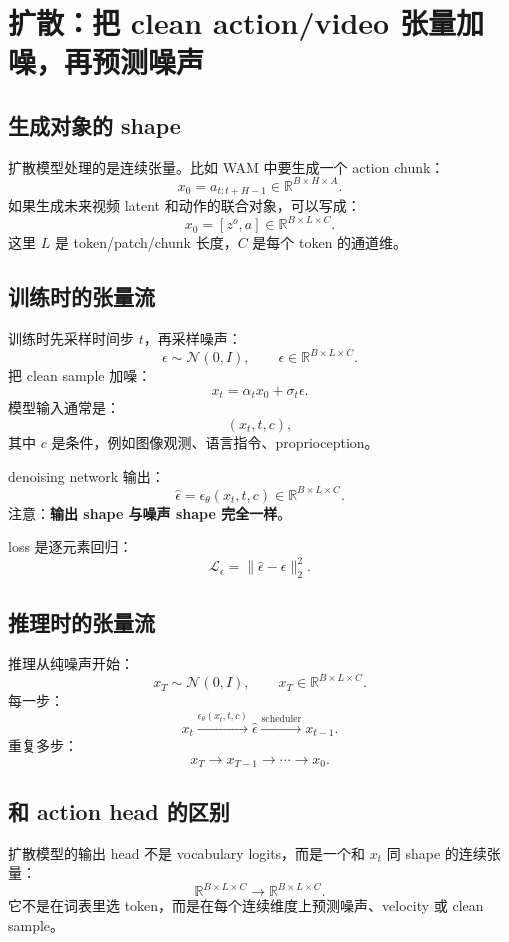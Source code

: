 \documentclass[11pt,a4paper]{ctexart}
\begin{document}
\section{扩散：把 clean action/video 张量加噪，再预测噪声}

\subsection{生成对象的 shape}

扩散模型处理的是连续张量。比如 WAM 中要生成一个 action chunk：
\[
  x_0=a_{t:t+H-1}\in\mathbb{R}^{B\times H\times A}.
\]
如果生成未来视频 latent 和动作的联合对象，可以写成：
\[
  x_0=[z^o,a]\in\mathbb{R}^{B\times L\times C}.
\]
这里 \(L\) 是 token/patch/chunk 长度，\(C\) 是每个 token 的通道维。

\subsection{训练时的张量流}

训练时先采样时间步 \(t\)，再采样噪声：
\[
  \epsilon\sim\mathcal{N}(0,I),
  \qquad
  \epsilon\in\mathbb{R}^{B\times L\times C}.
\]
把 clean sample 加噪：
\[
  x_t
  =
  \alpha_t x_0+\sigma_t\epsilon.
\]
模型输入通常是：
\[
  (x_t,t,c),
\]
其中 \(c\) 是条件，例如图像观测、语言指令、proprioception。

denoising network 输出：
\[
  \hat{\epsilon}
  =
  \epsilon_\theta(x_t,t,c)
  \in\mathbb{R}^{B\times L\times C}.
\]
注意：\textbf{输出 shape 与噪声 shape 完全一样}。

loss 是逐元素回归：
\[
  \mathcal{L}_{\epsilon}
  =
  \|\hat{\epsilon}-\epsilon\|_2^2.
\]

\subsection{推理时的张量流}

推理从纯噪声开始：
\[
  x_T\sim\mathcal{N}(0,I),
  \qquad
  x_T\in\mathbb{R}^{B\times L\times C}.
\]
每一步：
\[
  x_t
  \xrightarrow{\epsilon_\theta(x_t,t,c)}
  \hat{\epsilon}
  \xrightarrow{\mathrm{scheduler}}
  x_{t-1}.
\]
重复多步：
\[
  x_T\rightarrow x_{T-1}\rightarrow\cdots\rightarrow x_0.
\]

\subsection{和 action head 的区别}

扩散模型的输出 head 不是 vocabulary logits，而是一个和 \(x_t\) 同 shape 的连续张量：
\[
  \mathbb{R}^{B\times L\times C}\rightarrow
  \mathbb{R}^{B\times L\times C}.
\]
它不是在词表里选 token，而是在每个连续维度上预测噪声、velocity 或 clean sample。
\end{document}
